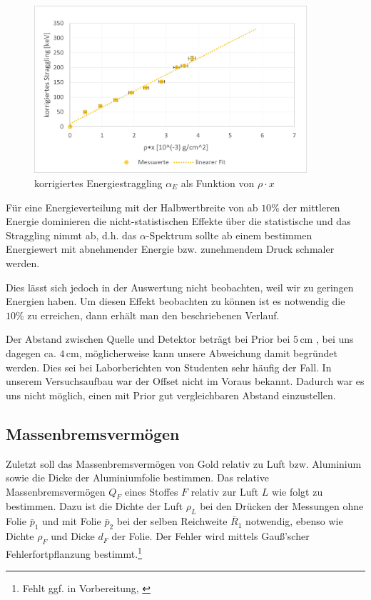 \documentclass[12pt,a4paper]{scrartcl}
\numberwithin{equation}{section} %
\begin{document}
\begin{figure}[h]
	\centering
	\includegraphics[width=0.9\textwidth]{../media/B3.3/Straggling corrected.jpg}
	\caption{korrigiertes Energiestraggling $\alpha _E$ als Funktion von $\rho \cdot x$}
	\label{abb:korr. Straggling}
\end{figure}

Für eine Energieverteilung mit der Halbwertbreite von ab $10\%$ der mittleren Energie dominieren die nicht-statistischen Effekte über die statistische und das Straggling nimmt ab, d.h. das $\alpha$-Spektrum sollte ab einem bestimmen Energiewert mit abnehmender Energie bzw. zunehmendem Druck schmaler werden.

Dies lässt sich jedoch in der Auswertung nicht beobachten, weil wir zu geringen Energien haben. Um diesen Effekt beobachten zu können ist es notwendig die $10\%$ zu erreichen, dann erhält man den beschriebenen Verlauf.

Der Abstand zwischen Quelle und Detektor beträgt bei Prior bei $5\mathrm{\,cm}$  \cite{Prior}, bei uns dagegen ca. $4\mathrm{\,cm}$, möglicherweise kann unsere Abweichung damit begründet werden. Dies sei bei Laborberichten von Studenten sehr häufig der Fall. \cite{Prior} In unserem Versuchsaufbau war der Offset nicht im Voraus bekannt. Dadurch war es uns nicht möglich, einen mit Prior gut vergleichbaren Abstand einzustellen.

\hypertarget{massenbremsvermuxf6gen}{%
\subsection{Massenbremsvermögen}\label{massenbremsvermuxf6gen}}

Zuletzt soll das Massenbremsvermögen von Gold relativ zu Luft bzw. Aluminium sowie die Dicke der Aluminiumfolie bestimmen. Das relative Massenbremsvermögen $Q_F$ eines Stoffes $F$ relativ zur Luft $L$ wie folgt zu bestimmen. Dazu ist die Dichte der Luft $\rho_L$ bei den Drücken der Messungen ohne Folie $\bar p_1$ und mit Folie $\bar p_2$ bei der selben Reichweite $\bar R_1$ notwendig, ebenso wie Dichte $\rho_F$ und Dicke $d_F$ der Folie. Der Fehler wird mittels Gauß'scher Fehlerfortpflanzung bestimmt.\footnote{Fehlt ggf. in Vorbereitung, \cite[p. 5]{Uni}}
\end{document}
